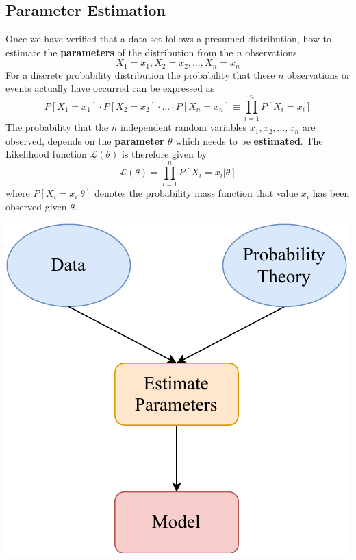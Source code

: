 \documentclass[11pt]{article}
\theoremstyle{definition}
\newcommand*\Likelihood{\mathcal{L}}
\begin{document}
\subsection{Parameter Estimation}
\begin{minipage}{0.6\linewidth}
	Once we have verified that a data set follows a presumed distribution, how to estimate the \textbf{parameters} of the distribution from the $n$ observations
	\begin{equation*}
		X_1 = x_1, X_2 = x_2, \dots , X_n = x_n
	\end{equation*}
	For a discrete probability distribution the probability that these $n$ observations or events actually have occurred can be expressed as
	\begin{equation*}
		P[X_1 = x_1] \cdot P[X_2 = x_2] \cdot \dots \cdot P[X_n = x_n] \equiv \prod_{i=1}^{n} P[X_i = x_i]
	\end{equation*}
	The probability that the $n$ independent random variables $x_1,x_2,\dots,x_n$ are observed, depends on the \textbf{parameter $\theta$} which needs to be \textbf{estimated}.
	The Likelihood function $\Likelihood(\theta)$ is therefore given by
	\begin{equation*}
		\Likelihood(\theta) = \prod_{i=1}^{n} P[X_i = x_i | \theta ]
	\end{equation*}
	where $P[X_i = x_i | \theta ]$ denotes the probability mass function that value $x_i$ has been observed given $\theta$.
\end{minipage}
\begin{minipage}{0.4\linewidth}
	\centering
	\includegraphics[keepaspectratio, width=0.8\linewidth]{probtheory_model}
\end{minipage}
\end{document}

